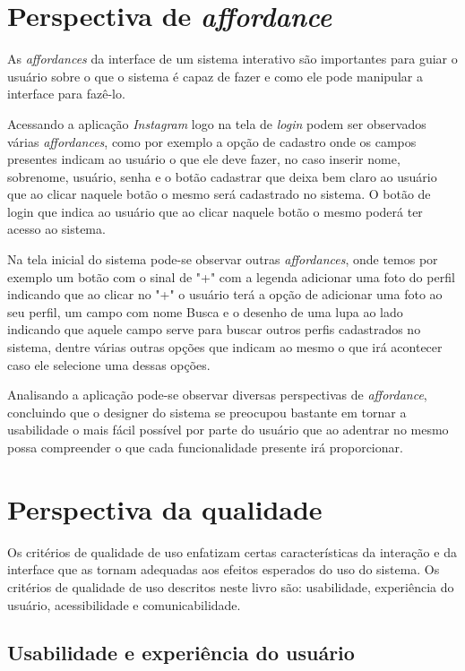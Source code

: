 \documentclass[
	12pt,				%
	openright,			%
	oneside,			%
	a4paper,			%
	english,			%
	french,				%
	spanish,			%
	brazil,				%
	]{abntex2}
\begin{document}
\chapter{Perspectiva de \textit{affordance}}

As \textit{affordances} da interface de um sistema interativo são importantes para guiar o usuário sobre o que o sistema é capaz de fazer e como ele pode manipular a interface para fazê-lo.

Acessando a aplicação \textit{Instagram} logo na tela de \textit{login} podem ser observados várias \textit{affordances}, como por exemplo a opção de cadastro onde os campos presentes indicam ao usuário o que ele deve fazer, no caso inserir nome, sobrenome, usuário, senha e o botão cadastrar que deixa bem claro ao usuário que ao clicar naquele botão o mesmo será cadastrado no sistema. O botão de login que indica ao usuário que ao clicar naquele botão o mesmo poderá ter acesso ao sistema.

Na tela inicial do sistema pode-se observar outras \textit{affordances}, onde temos por exemplo um botão com o sinal de "+" com a legenda adicionar uma foto do perfil indicando que ao clicar no "+" o usuário terá a opção de adicionar uma foto ao seu perfil, um campo com nome Busca e o desenho de uma lupa ao lado indicando que aquele campo serve para buscar outros perfis cadastrados no sistema, dentre várias outras opções que indicam ao mesmo o que irá acontecer caso ele selecione uma dessas opções.

Analisando a aplicação pode-se observar diversas perspectivas de \textit{affordance}, concluindo que o designer do sistema se preocupou bastante em tornar a usabilidade o mais fácil possível por parte do usuário que ao adentrar no mesmo possa compreender o que cada funcionalidade presente irá proporcionar.

\chapter{Perspectiva da qualidade}

Os critérios de qualidade de uso enfatizam certas características da interação e da interface que as tornam adequadas aos efeitos esperados do uso do sistema. Os critérios de qualidade de uso descritos neste livro são: usabilidade, experiência do usuário, acessibilidade e comunicabilidade.

\section{Usabilidade e experiência do usuário}
\end{document}
